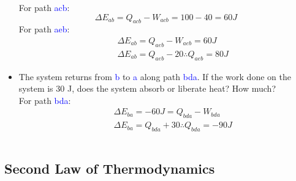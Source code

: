 \documentclass[10pt,compress,handout,ignorenonframetext]{beamer}
\begin{document}
\begin{frame}
\begin{columns}
\begin{column}[r]{0.5\linewidth}
\begin{itemize}
          For path \textcolor{blue}{acb}:
          \begin{displaymath}
           \Delta E_{ab} = Q_{acb}-W_{acb} = 100 - 40 = 60 J
          \end{displaymath}
          For path \textcolor{blue}{aeb}:
          \begin{eqnarray}
           &&\Delta E_{ab} = Q_{aeb}-W_{aeb} = 60 J \nonumber \\
           &&\Delta E_{ab} = Q_{aeb}-20 \therefore Q_{aeb} = 80 J \nonumber
          \end{eqnarray}
    \item<3-> The system returns from \textcolor{blue}{b} to \textcolor{blue}{a} along path \textcolor{blue}{bda}. If the work done on the system is 30 J, does the system absorb or liberate heat? How much? \\
           For path \textcolor{blue}{bda}: 
           \begin{eqnarray}
            &&\Delta E_{ba} = -60 J = Q_{bda}-W_{bda} \nonumber \\
            &&\Delta E_{ba} = Q_{bda} + 30 \therefore Q_{bda} = -90 J \nonumber
           \end{eqnarray}
   \end{itemize}
  \end{column}
 \end{columns}
\normalsize
\end{frame}


\subsection{Second Law of Thermodynamics}
\end{document}
